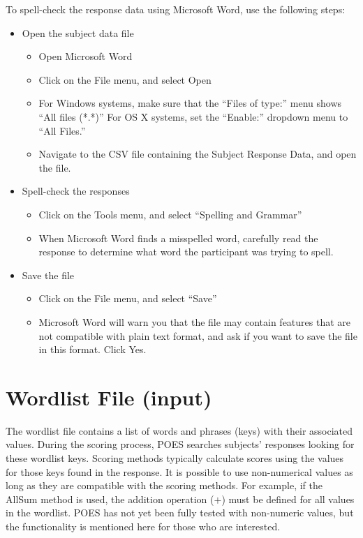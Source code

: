 \documentclass[11pt]{article}
\numberwithin{figure}{section}
\numberwithin{table}{section}
\begin{document}
To spell-check the response data using Microsoft Word, use the following steps:
\begin{itemize}
\item[] Open the subject data file
\begin{itemize}
\item[] Open Microsoft Word
\item[] Click on the File menu, and select Open
\item[] For Windows systems, make sure that the ``Files of type:'' menu shows ``All files (*.*)''  For OS X systems, set the ``Enable:'' dropdown menu to ``All Files.''
\item[] Navigate to the CSV file containing the Subject Response Data, and open the file.
\end{itemize}
\item[] Spell-check the responses
\begin{itemize}
\item[] Click on the Tools menu, and select ``Spelling and Grammar''
\item[] When Microsoft Word finds a misspelled word, carefully read the response to determine what word the participant was trying to spell.
\end{itemize}
\item[] Save the file
\begin{itemize}
\item[] Click on the File menu, and select ``Save''
\item[] Microsoft Word will warn you that the file may contain features that are not compatible with plain text format, and ask if you want to save the file in this format.  Click Yes.
\end{itemize}
\end{itemize}

 
\section{Wordlist File (input)}
\label{sec:wordlistfile}

The wordlist file contains a list of words and phrases (keys) with their associated values.  During the scoring process, POES searches subjects' responses looking for these wordlist keys.  Scoring methods typically calculate scores using the values for those keys found in the response.  It is possible to use non-numerical values as long as they are compatible with the scoring methods.  For example, if the AllSum method is used, the addition operation ($+$) must be defined for all values in the wordlist.  POES has not yet been fully tested with non-numeric values, but the functionality is mentioned here for those who are interested.
\end{document}
